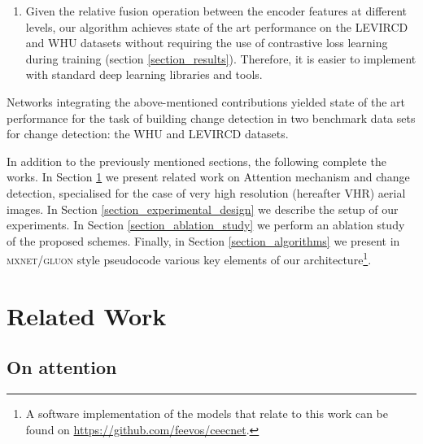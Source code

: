 \documentclass[times, 5p]{elsarticle}
\begin{document}
\begin{enumerate}
\item Given the relative fusion operation between the encoder features at different levels, our algorithm achieves state of the art performance on the LEVIRCD and WHU datasets without requiring the use of contrastive loss learning during training (section \ref{section_results}). Therefore,  it is easier to implement with standard deep learning libraries and tools. 
\end{enumerate}
Networks integrating the above-mentioned contributions yielded state of the art performance for the task of building change detection in two
benchmark data sets for change detection: the WHU \citep{Ji2019FullyCN} and LEVIRCD \citep{rs12101662} datasets. 

In addition to the previously mentioned sections, the following  complete the works. In Section \ref{related_work} we present related work on Attention mechanism and change detection, specialised for the case of very high resolution (hereafter VHR) aerial images. In Section \ref{section_experimental_design} we describe the setup of our experiments.  In Section \ref{section_ablation_study} we perform an ablation study of the proposed schemes.   Finally, in  Section \ref{section_algorithms} we present in \textsc{mxnet/gluon} style pseudocode various key elements of our architecture\footnote{A software implementation of  the  models that relate to this work can be found on \href{https://github.com/feevos/ceecnet}{https://github.com/feevos/ceecnet}.}.

 
  
 
\section{Related Work}
\label{related_work}

\subsection{On attention}
\end{document}
